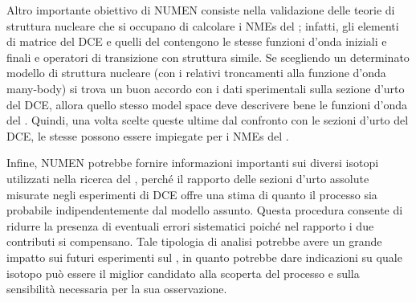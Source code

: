 Altro importante obiettivo di NUMEN consiste nella validazione delle teorie di struttura nucleare che si occupano di calcolare i NMEs del \doppiobeta{};
infatti, gli elementi di matrice del DCE e quelli del \doppiobeta{} contengono le stesse funzioni d'onda iniziali e finali e operatori di transizione con struttura simile. Se scegliendo un determinato modello di struttura nucleare (con i relativi troncamenti alla funzione d'onda many-body) si trova un buon accordo con i dati sperimentali sulla sezione d'urto del DCE, allora quello stesso model space deve descrivere bene le funzioni d'onda del \doppiobeta.
Quindi, una volta scelte queste ultime dal confronto con le sezioni d'urto del DCE, le stesse possono essere impiegate per i NMEs del \doppiobeta{}. 

Infine, NUMEN potrebbe fornire informazioni importanti sui diversi isotopi utilizzati nella ricerca del \doppiobeta{}, perché il rapporto delle sezioni d'urto assolute misurate negli esperimenti di DCE offre una stima di quanto il processo sia probabile indipendentemente dal modello assunto. 
Questa procedura consente di ridurre la presenza di eventuali errori sistematici poiché nel rapporto i due contributi si compensano.
Tale tipologia di analisi potrebbe avere un grande impatto sui futuri esperimenti sul \doppiobeta{}, in quanto potrebbe dare indicazioni su quale isotopo può essere il miglior candidato alla scoperta del processo e sulla sensibilità necessaria per la sua osservazione. 


